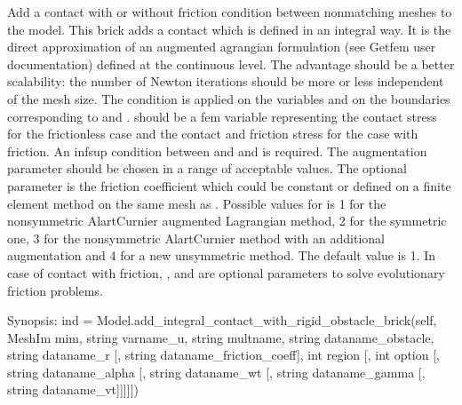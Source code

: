 \documentclass[a4paper,11pt,english]{sphinxmanual}
\begin{document}
\begin{fulllineitems}
\begin{fulllineitems}
Add a contact with or without friction condition between nonmatching
meshes to the model. This brick adds a contact which is defined
in an integral way. It is the direct approximation of an augmented
agrangian formulation (see Getfem user documentation) defined at the
continuous level. The advantage should be a better scalability:
the number of Newton iterations should be more or less independent
of the mesh size.
The condition is applied on the variables  and 
on the boundaries corresponding to  and .
 should be a fem variable representing the contact stress
for the frictionless case and the contact and friction stress for the
case with friction. An inf\sphinxhyphen{}sup condition between  and
 and  is required.
The augmentation parameter  should be chosen in a
range of acceptable values.
The optional parameter  is the friction
coefficient which could be constant or defined on a finite element
method on the same mesh as .
Possible values for  is 1 for the non\sphinxhyphen{}symmetric Alart\sphinxhyphen{}Curnier
augmented Lagrangian method, 2 for the symmetric one, 3 for the
non\sphinxhyphen{}symmetric Alart\sphinxhyphen{}Curnier method with an additional augmentation
and 4 for a new unsymmetric method. The default value is 1.
In case of contact with friction, ,  and
 are optional parameters to solve evolutionary friction
problems.

\end{fulllineitems}


\begin{fulllineitems}
\label{\detokenize{python/cmdref_Model:getfem.Model.add_integral_contact_with_rigid_obstacle_brick}}
Synopsis: ind = Model.add\_integral\_contact\_with\_rigid\_obstacle\_brick(self,  MeshIm mim, string varname\_u, string multname, string dataname\_obstacle, string dataname\_r {[}, string dataname\_friction\_coeff{]}, int region {[}, int option {[}, string dataname\_alpha {[}, string dataname\_wt {[}, string dataname\_gamma {[}, string dataname\_vt{]}{]}{]}{]}{]})


\end{fulllineitems}
\end{fulllineitems}
\end{document}
